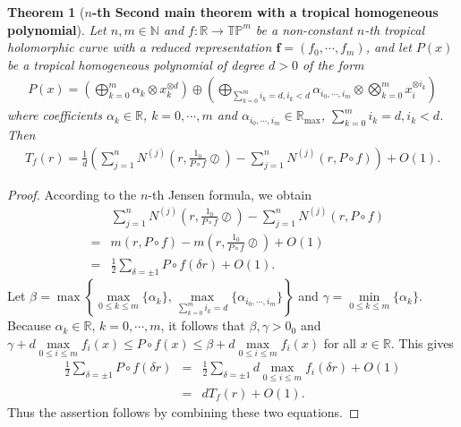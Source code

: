 \documentclass{article}
\newtheorem{theorem}[defin]{Theorem}
\begin{document}
\begin{theorem}[\textbf{$n$-th Second main theorem with a tropical homogeneous polynomial}]\label{theorem5.6}
     Let $n, m\in\mathbb{N}$ and $f:\mathbb{R}\rightarrow \mathbb{T}\mathbb{P}^{m}$ be a non-constant $n$-th tropical holomorphic curve with a reduced representation $\textbf{f}=(f_{0}, \cdots, f_{m})$, and let $P(x)$ be a tropical homogeneous polynomial of degree $d>0$ of the form
    \begin{eqnarray*}
        P(x)=\left(\bigoplus_{k=0}^{m}\alpha_{k}\otimes x_{k}^{\otimes d}\right)\oplus\left(\bigoplus_{\sum_{k=0}^{m}i_{k}=d, i_{k}<d}\alpha_{i_{0}, \cdots, i_{m}}\otimes \bigotimes_{k=0}^{m}x_{i}^{\otimes i_{k}}\right)
    \end{eqnarray*}
    where coefficients $\alpha_{k}\in\mathbb{R}$, $k=0, \cdots, m$ and $\alpha_{i_{0}, \cdots, i_{m}}\in\mathbb{R}_{\max}$, $\sum_{k=0}^{m}i_{k}=d, i_{k}<d$. Then
    \begin{eqnarray}
        T_{f}(r)=\frac{1}{d}\left(\sum_{j=1}^{n}N^{(j)}\left(r, \frac{1_{0}}{P\circ f}\oslash\right)-\sum_{j=1}^{n}N^{(j)}\left(r, P\circ f\right)\right)+O(1).
    \end{eqnarray}
\end{theorem}
\begin{proof}
    According to the $n$-th Jensen formula, we obtain
    \begin{eqnarray*}
        &&\sum_{j=1}^{n}N^{(j)}\left(r, \frac{1_{0}}{P\circ f}\oslash\right)-\sum_{j=1}^{n}N^{(j)}(r, P\circ f)\\
        &=&m(r, P\circ f)-m\left(r, \frac{1_{0}}{P\circ f}\oslash\right)+O(1)\\
        &=&\frac{1}{2}\sum_{\delta=\pm 1}P\circ f(\delta r)+O(1).
    \end{eqnarray*}
Let $\beta=\max\left\{\max\limits_{0\leq k\leq m}\{\alpha_{k}\}, \max\limits_{\sum_{k=0}^{m}i_{k}=d}\{\alpha_{i_{0}, \cdots, i_{m}}\}\right\}$ and $\gamma=\min\limits_{0\leq k\leq m}\{\alpha_{k}\}$. Because $\alpha_{k}\in\mathbb{R}$, $k=0, \cdots, m$, it follows that $\beta, \gamma>0_{0}$ and $\gamma+d\max\limits_{0\leq i\leq m}f_{i}(x)\leq P\circ f(x)\leq \beta+d\max\limits_{0\leq i\leq m}f_{i}(x)$ for all $x\in\mathbb{R}$. This gives
    \begin{eqnarray*}
        \frac{1}{2}\sum_{\delta=\pm 1}P\circ f(\delta r)&=&\frac{1}{2}\sum_{\delta=\pm 1}d\max\limits_{0\leq i\leq m}f_{i}(\delta r)+O(1)\\
        &=&dT_{f}(r)+O(1).
    \end{eqnarray*}
    Thus the assertion follows by combining these two equations.
\end{proof}
\end{document}
